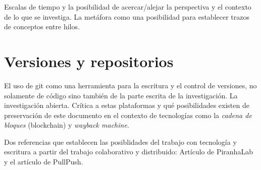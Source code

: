 Escalas de tiempo y la posibilidad de acercar/alejar la perspectiva y el contexto de lo que se investiga. La metáfora como una posibilidad para establecer trazos de conceptos entre hilos. 



\section{Versiones y repositorios}

El uso de \gls{git} como una herramienta para la escritura y el control de versiones, no solamente de código sino también de la parte escrita de la investigación. La investigación abierta. Crítica a estas plataformas y qué posibilidades existen de preservación de este documento en el contexto de tecnologías como la \emph{cadena de bloques} (blockchain) y \emph{wayback machine}. 

Dos referencias que establecen las posiblidades del trabajo con tecnología y escritura a partir del trabajo colaborativo y distribuido: Artículo de PiranhaLab y el artículo de PullPush. 
